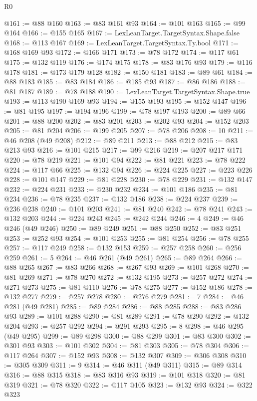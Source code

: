 \begin{lexlean}{R0}
\begin{coremodule}
@161 := @88 @160
@163 := @83 @161 @93
@164 := @101 @163
@165 := @99 @164
@166 := @155 @165
@167 := LexLeanTarget.TargetSyntax.Shape.false
@168 := @113 @167
@169 := LexLeanTarget.TargetSyntax.Ty.bool
@171 := @168 @169 @93
@172 := @166 @171
@173 := @78 @172
@174 := @117 @61
@175 := @132 @119
@176 := @174 @175
@178 := @83 @176 @93
@179 := @116 @178
@181 := @173 @179 @128
@182 := @150 @181
@183 := @89 @61
@184 := @88 @183
@185 := @83 @184
@186 := @185 @93
@187 := @86 @186
@188 := @81 @187
@189 := @78 @188
@190 := LexLeanTarget.TargetSyntax.Shape.true
@193 := @113 @190 @169 @93
@194 := @155 @193
@195 := @152 @147
@196 := @81 @195
@197 := @194 @196
@199 := @78 @197 @193
@200 := @89 @66
@201 := @88 @200
@202 := @83 @201
@203 := @202 @93
@204 := @152 @203
@205 := @81 @204
@206 := @199 @205
@207 := @78 @206
@208 := 10
@211 := @46 @208 (@49 @208)
@212 := @89 @211
@213 := @88 @212
@215 := @83 @213 @93
@216 := @101 @215
@217 := @99 @216
@219 := @207 @217 @171
@220 := @78 @219
@221 := @101 @94
@222 := @81 @221
@223 := @78 @222
@224 := @117 @66
@225 := @132 @94
@226 := @224 @225
@227 := @223 @226
@228 := @101 @147
@229 := @81 @228
@230 := @78 @229
@231 := @132 @147
@232 := @224 @231
@233 := @230 @232
@234 := @101 @186
@235 := @81 @234
@236 := @78 @235
@237 := @132 @186
@238 := @224 @237
@239 := @236 @238
@240 := @101 @203
@241 := @81 @240
@242 := @78 @241
@243 := @132 @203
@244 := @224 @243
@245 := @242 @244
@246 := 4
@249 := @46 @246 (@49 @246)
@250 := @89 @249
@251 := @88 @250
@252 := @83 @251
@253 := @252 @93
@254 := @101 @253
@255 := @81 @254
@256 := @78 @255
@257 := @117 @249
@258 := @132 @153
@259 := @257 @258
@260 := @256 @259
@261 := 5
@264 := @46 @261 (@49 @261)
@265 := @89 @264
@266 := @88 @265
@267 := @83 @266
@268 := @267 @93
@269 := @101 @268
@270 := @81 @269
@271 := @78 @270
@272 := @132 @195
@273 := @257 @272
@274 := @271 @273
@275 := @81 @110
@276 := @78 @275
@277 := @152 @186
@278 := @132 @277
@279 := @257 @278
@280 := @276 @279
@281 := 7
@284 := @46 @281 (@49 @281)
@285 := @89 @284
@286 := @88 @285
@288 := @83 @286 @93
@289 := @101 @288
@290 := @81 @289
@291 := @78 @290
@292 := @132 @204
@293 := @257 @292
@294 := @291 @293
@295 := 8
@298 := @46 @295 (@49 @295)
@299 := @89 @298
@300 := @88 @299
@301 := @83 @300
@302 := @301 @93
@303 := @101 @302
@304 := @81 @303
@305 := @78 @304
@306 := @117 @264
@307 := @152 @93
@308 := @132 @307
@309 := @306 @308
@310 := @305 @309
@311 := 9
@314 := @46 @311 (@49 @311)
@315 := @89 @314
@316 := @88 @315
@318 := @83 @316 @93
@319 := @101 @318
@320 := @81 @319
@321 := @78 @320
@322 := @117 @105
@323 := @132 @93
@324 := @322 @323

\end{coremodule}
\end{lexlean}
